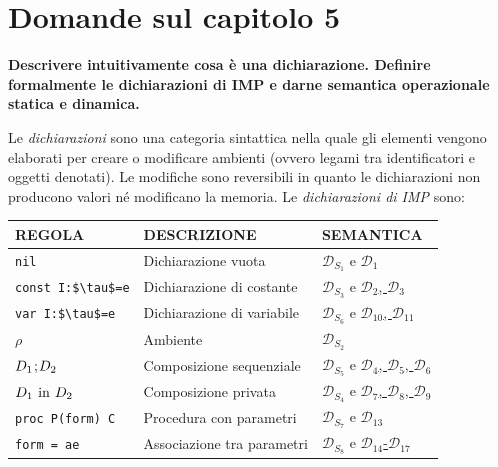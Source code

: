 \documentclass[a4paper,oneside,titlepage]{book}
\begin{document}
\section{Domande sul capitolo 5}
\textbf{Descrivere intuitivamente cosa è una dichiarazione. Definire formalmente le dichiarazioni di IMP e darne semantica operazionale statica e dinamica.}

Le \emph{dichiarazioni} sono una categoria sintattica nella quale gli elementi vengono elaborati per creare o modificare ambienti (ovvero legami tra identificatori e oggetti denotati). Le modifiche sono reversibili in quanto le dichiarazioni non producono valori né modificano la memoria. Le \emph{dichiarazioni di IMP} sono:
\begin{center}
	\begin{tabular}{lll}
		\toprule
		\textbf{REGOLA} & \textbf{DESCRIZIONE} & \textbf{SEMANTICA} \\
		
		\midrule
		\lstinline|nil| & Dichiarazione vuota & \hyperref[sec:decSemStat1]{$\mathcal{D}_{S_1}$} e \hyperref[sec:decSemDin1]{$\mathcal{D}_1$} \\
		
		\midrule
		\lstinline|const I:$\tau$=e| & Dichiarazione di costante & \hyperref[sec:decSemStat1]{$\mathcal{D}_{S_3}$} e \hyperref[sec:decSemDin1]{$\mathcal{D}_2$, $\mathcal{D}_3$} \\
		
		\midrule
		\lstinline|var I:$\tau$=e| & Dichiarazione di variabile & \hyperref[sec:decSemStat2]{$\mathcal{D}_{S_6}$} e \hyperref[sec:decSemDin2]{$\mathcal{D}_{10}$, $\mathcal{D}_{11}$} \\
		
		\midrule
		$\rho$ & Ambiente & \hyperref[sec:decSemStat1]{$\mathcal{D}_{S_2}$} \\
		
		\midrule
		$D_1 \text{\lstinline|;|} D_2$ & Composizione sequenziale & \hyperref[sec:decSemStat1]{$\mathcal{D}_{S_5}$} e \hyperref[sec:decSemDin1]{$\mathcal{D}_4$, $\mathcal{D}_5$, $\mathcal{D}_6$} \\
		
		\midrule
		$D_1 \text{ \lstinline|in| } D_2$ & Composizione privata & \hyperref[sec:decSemStat1]{$\mathcal{D}_{S_4}$} e \hyperref[sec:decSemDin1]{$\mathcal{D}_7$, $\mathcal{D}_8$, $\mathcal{D}_9$} \\
		
		\midrule
		\lstinline|proc P(form) C| & Procedura con parametri & \hyperref[sec:decSemStat3]{$\mathcal{D}_{S_7}$} e \hyperref[sec:decSemDin3]{$\mathcal{D}_{13}$} \\
		
		\midrule
		\lstinline|form = ae| & Associazione tra parametri & \hyperref[sec:decSemStat3]{$\mathcal{D}_{S_8}$} e \hyperref[sec:decSemDin3]{$\mathcal{D}_{14}$-$\mathcal{D}_{17}$} \\
		
		\bottomrule
	\end{tabular}
\end{center}
\end{document}
